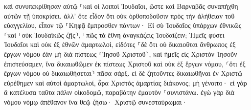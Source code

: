 \documentclass{openreader}
\begin{document}
καὶ συνυπεκρίθησαν αὐτῷ ⸀καὶ οἱ λοιποὶ Ἰουδαῖοι, ὥστε καὶ Βαρναβᾶς συναπήχθη αὐτῶν τῇ ὑποκρίσει. 
ἀλλ’ ὅτε εἶδον ὅτι οὐκ ὀρθοποδοῦσιν πρὸς τὴν ἀλήθειαν τοῦ εὐαγγελίου, εἶπον τῷ ⸀Κηφᾷ ἔμπροσθεν πάντων· Εἰ σὺ Ἰουδαῖος ὑπάρχων ἐθνικῶς ⸂καὶ ⸀οὐκ Ἰουδαϊκῶς ζῇς⸃, ⸀πῶς τὰ ἔθνη ἀναγκάζεις Ἰουδαΐζειν; 
Ἡμεῖς φύσει Ἰουδαῖοι καὶ οὐκ ἐξ ἐθνῶν ἁμαρτωλοί, 
εἰδότες ⸀δὲ ὅτι οὐ δικαιοῦται ἄνθρωπος ἐξ ἔργων νόμου ἐὰν μὴ διὰ πίστεως ⸂Ἰησοῦ Χριστοῦ⸃, καὶ ἡμεῖς εἰς Χριστὸν Ἰησοῦν ἐπιστεύσαμεν, ἵνα δικαιωθῶμεν ἐκ πίστεως Χριστοῦ καὶ οὐκ ἐξ ἔργων νόμου, ⸂ὅτι ἐξ ἔργων νόμου οὐ δικαιωθήσεται⸃ πᾶσα σάρξ. 
εἰ δὲ ζητοῦντες δικαιωθῆναι ἐν Χριστῷ εὑρέθημεν καὶ αὐτοὶ ἁμαρτωλοί, ἆρα Χριστὸς ἁμαρτίας διάκονος; μὴ γένοιτο· 
εἰ γὰρ ἃ κατέλυσα ταῦτα πάλιν οἰκοδομῶ, παραβάτην ἐμαυτὸν ⸀συνιστάνω. 
ἐγὼ γὰρ διὰ νόμου νόμῳ ἀπέθανον ἵνα θεῷ ζήσω· Χριστῷ συνεσταύρωμαι· 
\end{document}
